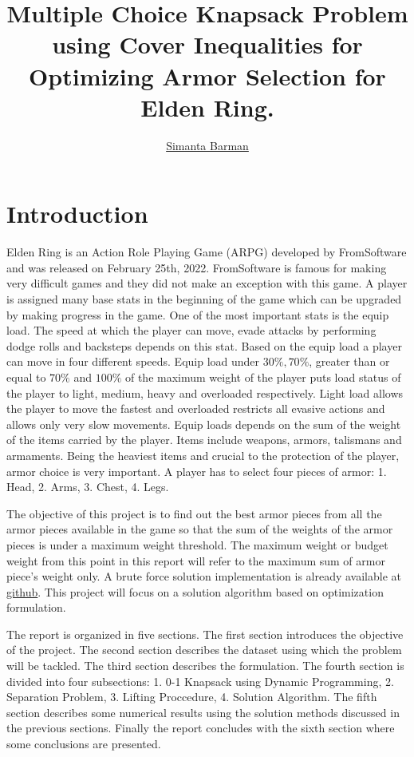 \documentclass[10pt]{article}
\title{
    Multiple Choice Knapsack Problem using Cover Inequalities for Optimizing Armor Selection for Elden Ring.
}
\author{
    \href{barma017@umn.edu}{Simanta Barman}
}
\date{}
\begin{document}
    \begin{titlepage}
        \maketitle
        \thispagestyle{empty}
    \end{titlepage}

    \section{Introduction}
    Elden Ring is an Action Role Playing Game (ARPG) developed by FromSoftware and was released on February 25th, 2022.
    FromSoftware is famous for making very difficult games and they did not make an exception with this game. A player
    is assigned many base stats in the beginning of the game which can be upgraded by making progress in the game. One
    of the most important stats is the equip load. The speed at which the player can move, evade attacks by performing
    dodge rolls and backsteps depends on this stat. Based on the equip load a player can move in four different speeds.
    Equip load under $30\%, 70\%$, greater than or equal to $70\%$ and $100\%$ of the maximum weight of the player puts
    load status of the player to light, medium, heavy and overloaded respectively. Light load allows the player to move
    the fastest and overloaded restricts all evasive actions and allows only very slow movements. Equip loads depends on
    the sum of the weight of the items carried by the player. Items include weapons, armors, talismans and armaments.
    Being the heaviest items and crucial to the protection of the player, armor choice is very important. A player
    has to select four pieces of armor: 1. Head, 2. Arms, 3. Chest, 4. Legs.

    The objective of this project is to find out the best armor pieces from all the armor pieces available in the game
    so that the sum of the weights of the armor pieces is under a maximum weight threshold. The maximum weight or budget
    weight from this point in this report will refer to the maximum sum of armor piece's weight only. A brute force solution 
    implementation is already available at \href{https://github.com/oureuphoriant/Elden_Ring_Armor_Calc}{github}. This
    project will focus on a solution algorithm based on optimization formulation.

    The report is organized in five sections. The first section introduces the objective of the project. The second
    section describes the dataset using which the problem will be tackled. The third section describes the formulation.
    The fourth section is divided into four subsections: 1. 0-1 Knapsack using Dynamic Programming, 2. Separation
    Problem, 3. Lifting Proccedure, 4. Solution Algorithm. The fifth section describes some numerical results using the
    solution methods discussed in the previous sections. Finally the report concludes with the sixth section where some
    conclusions are presented.
\end{document}
